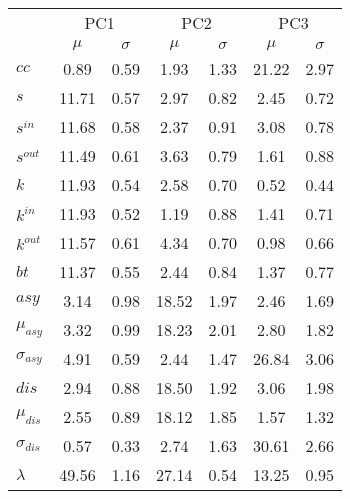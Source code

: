 \documentclass[10pt]{beamer}
\begin{document}
\begin{frame}
\begin{minipage}[t]{0.48\linewidth}
\end{minipage}
\hfill%
	\begin{minipage}[t]{0.48\linewidth}
\begin{table}[!h]
		\tiny
\begin{center}
\begin{tabular}{| l | c | c | c | c | c | c |}\cline{2-7}
\multicolumn{1}{c|}{} & \multicolumn{2}{c|}{PC1}          & \multicolumn{2}{c|}{PC2} & \multicolumn{2}{c|}{PC3}  \\\cline{2-7}\multicolumn{1}{c|}{} & $\mu$            & $\sigma$ & $\mu$         & $\sigma$ & $\mu$ & $\sigma$  \\\hline
$cc$ & 0.89  & 0.59  & 1.93  & 1.33  & 21.22  & 2.97 \\\hline
$s$ & 11.71  & 0.57  & 2.97  & 0.82  & 2.45  & 0.72 \\
$s^{in}$ & 11.68  & 0.58  & 2.37  & 0.91  & 3.08  & 0.78 \\
$s^{out}$ & 11.49  & 0.61  & 3.63  & 0.79  & 1.61  & 0.88 \\
$k$ & 11.93  & 0.54  & 2.58  & 0.70  & 0.52  & 0.44 \\
$k^{in}$ & 11.93  & 0.52  & 1.19  & 0.88  & 1.41  & 0.71 \\
$k^{out}$ & 11.57  & 0.61  & 4.34  & 0.70  & 0.98  & 0.66 \\
$bt$ & 11.37  & 0.55  & 2.44  & 0.84  & 1.37  & 0.77 \\\hline
$asy$ & 3.14  & 0.98  & 18.52  & 1.97  & 2.46  & 1.69 \\
$\mu_{asy}$ & 3.32  & 0.99  & 18.23  & 2.01  & 2.80  & 1.82 \\
$\sigma_{asy}$ & 4.91  & 0.59  & 2.44  & 1.47  & 26.84  & 3.06 \\
$dis$ & 2.94  & 0.88  & 18.50  & 1.92  & 3.06  & 1.98 \\
$\mu_{dis}$ & 2.55  & 0.89  & 18.12  & 1.85  & 1.57  & 1.32 \\
$\sigma_{dis}$ & 0.57  & 0.33  & 2.74  & 1.63  & 30.61  & 2.66 \\\hline\hline
$\lambda$ & 49.56  & 1.16  & 27.14  & 0.54  & 13.25  & 0.95 \\
\hline\end{tabular}
\end{center}
	\end{table}
	\end{minipage}
\end{frame}
\end{document}
